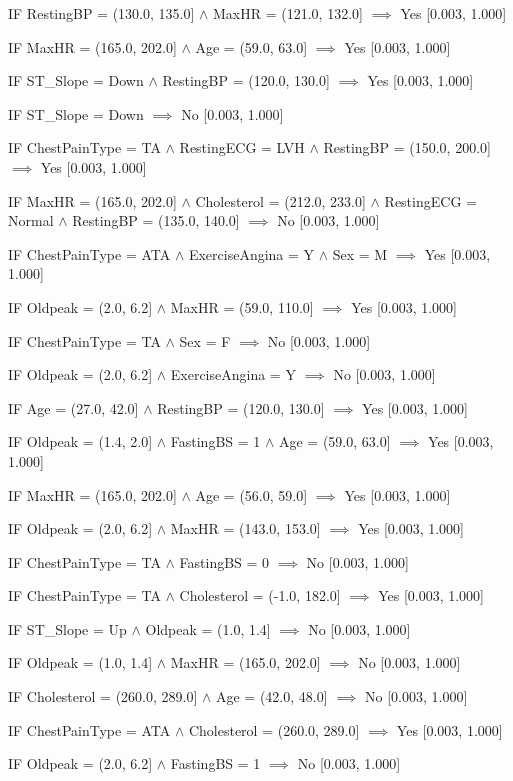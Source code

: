 IF RestingBP = (130.0, 135.0] $\land$ MaxHR = (121.0, 132.0] $\implies$ Yes [0.003, 1.000]

IF MaxHR = (165.0, 202.0] $\land$ Age = (59.0, 63.0] $\implies$ Yes [0.003, 1.000]

IF ST\_Slope = Down $\land$ RestingBP = (120.0, 130.0] $\implies$ Yes [0.003, 1.000]

IF ST\_Slope = Down $\implies$ No [0.003, 1.000]

IF ChestPainType = TA $\land$ RestingECG = LVH $\land$ RestingBP = (150.0, 200.0] $\implies$ Yes [0.003, 1.000]

IF MaxHR = (165.0, 202.0] $\land$ Cholesterol = (212.0, 233.0] $\land$ RestingECG = Normal $\land$ RestingBP = (135.0, 140.0] $\implies$ No [0.003, 1.000]

IF ChestPainType = ATA $\land$ ExerciseAngina = Y $\land$ Sex = M $\implies$ Yes [0.003, 1.000]

IF Oldpeak = (2.0, 6.2] $\land$ MaxHR = (59.0, 110.0] $\implies$ Yes [0.003, 1.000]

IF ChestPainType = TA $\land$ Sex = F $\implies$ No [0.003, 1.000]

IF Oldpeak = (2.0, 6.2] $\land$ ExerciseAngina = Y $\implies$ No [0.003, 1.000]

IF Age = (27.0, 42.0] $\land$ RestingBP = (120.0, 130.0] $\implies$ Yes [0.003, 1.000]

IF Oldpeak = (1.4, 2.0] $\land$ FastingBS = 1 $\land$ Age = (59.0, 63.0] $\implies$ Yes [0.003, 1.000]

IF MaxHR = (165.0, 202.0] $\land$ Age = (56.0, 59.0] $\implies$ Yes [0.003, 1.000]

IF Oldpeak = (2.0, 6.2] $\land$ MaxHR = (143.0, 153.0] $\implies$ Yes [0.003, 1.000]

IF ChestPainType = TA $\land$ FastingBS = 0 $\implies$ No [0.003, 1.000]

IF ChestPainType = TA $\land$ Cholesterol = (-1.0, 182.0] $\implies$ Yes [0.003, 1.000]

IF ST\_Slope = Up $\land$ Oldpeak = (1.0, 1.4] $\implies$ No [0.003, 1.000]

IF Oldpeak = (1.0, 1.4] $\land$ MaxHR = (165.0, 202.0] $\implies$ No [0.003, 1.000]

IF Cholesterol = (260.0, 289.0] $\land$ Age = (42.0, 48.0] $\implies$ No [0.003, 1.000]

IF ChestPainType = ATA $\land$ Cholesterol = (260.0, 289.0] $\implies$ Yes [0.003, 1.000]

IF Oldpeak = (2.0, 6.2] $\land$ FastingBS = 1 $\implies$ No [0.003, 1.000]

